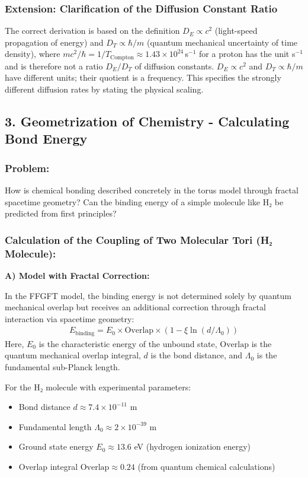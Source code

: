 	\subsubsection*{Extension: Clarification of the Diffusion Constant Ratio}
	The correct derivation is based on the definition $D_E \propto c^2$ (light-speed propagation of energy) and $D_T \propto \hbar / m$ (quantum mechanical uncertainty of time density), where $m c^2 / \hbar = 1 / T_{\text{Compton}} \approx 1.43 \times 10^{24}$\,s$^{-1}$ for a proton has the unit s$^{-1}$ and is therefore not a ratio $D_E / D_T$ of diffusion constants. $D_E \propto c^2$ and $D_T \propto \hbar/m$ have different units; their quotient is a frequency. This specifies the strongly different diffusion rates by stating the physical scaling.
	
	\subsection*{3. Geometrization of Chemistry - Calculating Bond Energy}
	
	\subsubsection*{Problem:}
	How is chemical bonding described concretely in the torus model through fractal spacetime geometry? Can the binding energy of a simple molecule like H₂ be predicted from first principles?
	
	\subsubsection*{Calculation of the Coupling of Two Molecular Tori (H₂ Molecule):}
	
	\textbf{A) Model with Fractal Correction:}
	
	In the FFGFT model, the binding energy is not determined solely by quantum mechanical overlap but receives an additional correction through fractal interaction via spacetime geometry:
	\begin{align*}
		E_{\text{binding}} = E_0 \times \text{Overlap} \times \left(1 - \xi \ln(d/\Lambda_0)\right)
	\end{align*}
	Here, $E_0$ is the characteristic energy of the unbound state, $\text{Overlap}$ is the quantum mechanical overlap integral, $d$ is the bond distance, and $\Lambda_0$ is the fundamental sub-Planck length.
	
	For the H₂ molecule with experimental parameters:
	\begin{itemize}
		\item Bond distance $d \approx 7.4 \times 10^{-11}$ m
		\item Fundamental length $\Lambda_0 \approx 2 \times 10^{-39}$ m
		\item Ground state energy $E_0 \approx 13.6$ eV (hydrogen ionization energy)
		\item Overlap integral $\text{Overlap} \approx 0.24$ (from quantum chemical calculations)
	\end{itemize}
	
